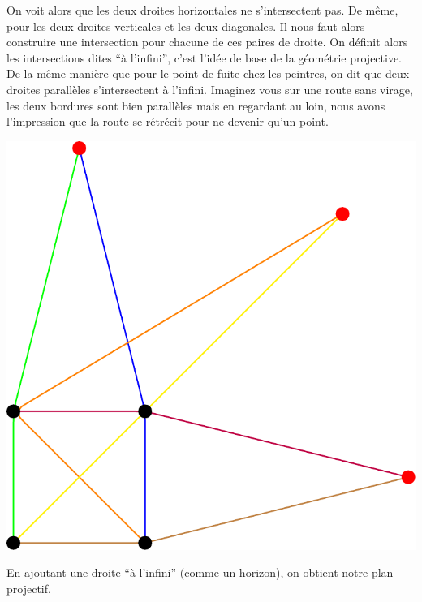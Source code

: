 \documentclass[a4paper]{article}
\begin{document}
On voit alors que les deux droites horizontales ne s'intersectent pas. De même, pour les deux droites verticales et les deux diagonales. Il nous faut alors construire une intersection pour chacune de ces paires de droite. On définit alors les intersections dites ``à l'infini'', c'est l'idée de base de la géométrie projective. De la même manière que pour le point de fuite chez les peintres, on dit que deux droites parallèles s'intersectent à l'infini. Imaginez vous sur une route sans virage, les deux bordures sont bien parallèles mais en regardant au loin, nous avons l'impression que la route se rétrécit pour ne devenir qu'un point.\\
\begin{center}
\includegraphics[scale=0.5]{planproj2.pdf}
\end{center}
\newpage
En ajoutant une droite ``à l'infini'' (comme un horizon), on obtient notre plan projectif.
\end{document}
